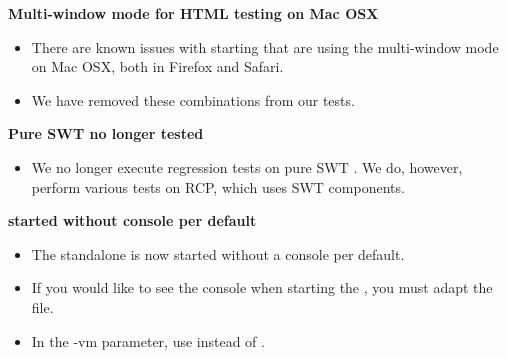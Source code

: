 \textbf{Multi-window mode for HTML testing on Mac OSX}
\begin{itemize}
\item There are known issues with starting \gdauts{} that are using the multi-window mode on Mac OSX, both in Firefox and Safari.
\item We have removed these combinations from our tests.
\end{itemize}

\textbf{Pure SWT \gdauts{} no longer tested}
\begin{itemize}
\item We no longer execute regression tests on pure SWT \gdauts{}. We do, however, perform various tests on RCP, which uses SWT components. 
\end{itemize}

\textbf{\gdagent{} started without console per default}
\begin{itemize}
\item The standalone \gdagent{} is now started without a console per default.
\item If you would like to see the console when starting the \gdagent{}, you must adapt the  file.
\item In the -vm parameter, use  instead of .
\end{itemize}
